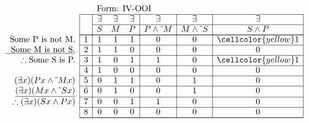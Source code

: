 \documentclass[10pt,legalpaper,landscape,cmtt]{article}
\begin{document}
{\begin{minipage}[t]{3.25in}
	\(
	\begin{array}{r|c|ccc|c|c|c|}
		\multicolumn{2}{c}{}&\multicolumn{6}{l}{\mbox{Form: IV-OOI}} \\ \cline{2-8}
		\hspace{1in}	&	& \exists & \exists & \exists & \exists & \exists & \exists\\ \cline{3-8}
		&	& S & M & P &  P \wedge \tilde~M  &  M \wedge \tilde~S  &  S \wedge P \\ \cline{2-8} \cline{2-8}
		\phantom{\therefore}\mbox{Some P is not M.}   & 1 & 1 & 1 & 1 &   0   &   0   &   \cellcolor{yellow} 1  \\ \cline{2-8}
		\underline{\phantom{\therefore}\mbox{Some M is not S.}}   & 2 & 1 & 1 & 0 &   0   &   0   &   0  \\ \cline{2-8}
		\therefore \mbox{Some S is P.}   & 3 & 1 & 0 & 1 &   1   &   0   &   \cellcolor{yellow} 1  \\ \cline{2-8}
		& 4 & 1 & 0 & 0 &   0   &   0   &   0  \\ \cline{2-8}
		(\exists x)(Px \wedge \tilde~Mx)   & 5 & 0 & 1 & 1 &   0   &   1   &   0  \\ \cline{2-8}
		\underline{(\exists x)(Mx \wedge \tilde~Sx)}   & 6 & 0 & 1 & 0 &   0   &   1   &   0  \\ \cline{2-8}
		\therefore(\exists x)(Sx \wedge Px)   & 7 & 0 & 0 & 1 &   1   &   0   &   0  \\ \cline{2-8}
		& 8 & 0 & 0 & 0 &   0   &   0   &   0   \\ \cline{2-8}\cline{2-8} 
	\end{array}
	\)
\end{minipage}

}
\end{document}
